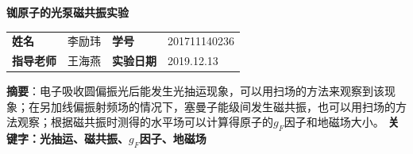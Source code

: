 \documentclass[UTF8]{ctexart}
\begin{document}
\begin{center}
\Huge\textbf{铷原子的光泵磁共振实验}
\renewcommand{\baselinestretch}{5.0}
\end{center}
\begin{center}
\small
\begin{tabular}{llll}
\textbf{姓名}&李励玮     &\textbf{学号}  &201711140236\\
\textbf{指导老师}&王海燕 &\textbf{实验日期}& 2019.12.13\\
\end{tabular}
\end{center}

\small
\noindent\textbf{摘要}：电子吸收圆偏振光后能发生光抽运现象，可以用扫场的方法来观察到该现象；在另加线偏振射频场的情况下，塞曼子能级间发生磁共振，也可以用扫场的方法观察；根据磁共振时测得的水平场可以计算得原子的$g_F$因子和地磁场大小。
\newline\textbf{关键字：光抽运、磁共振、$g_F$因子、地磁场}
\end{document}
